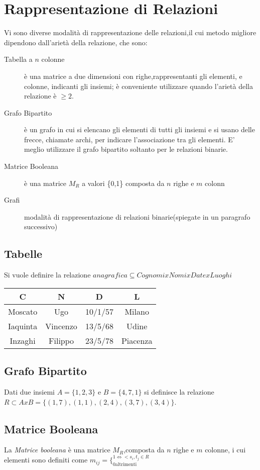 \section{Rappresentazione di Relazioni}
Vi sono diverse modalità di rappresentazione delle relazioni,il cui metodo migliore
dipendono dall'arietà della relazione, che sono:
\begin{description}
    \item[Tabella a $n$ colonne] è una matrice a due dimensioni con righe,rappresentanti
          gli elementi, e colonne, indicanti gli insiemi; è conveniente utilizzare
          quando l'arietà della relazione è $\geq 2$.
    \item[Grafo Bipartito] è un grafo in cui si elencano gli elementi di tutti gli insiemi
         e si usano delle frecce, chiamate archi, per indicare l'associazione tra gli elementi.
         E' meglio utilizzare il grafo bipartito soltanto per le relazioni binarie.
    \item[Matrice Booleana] è una matrice $M_R$ a valori \{0,1\} composta da $n$ righe e $m$ colonn
    \item[Grafi] modalità di rappresentazione di relazioni binarie(spiegate in un paragrafo successivo)
\end{description}

\subsection{Tabelle}
Si vuole definire la relazione $anagrafica \subseteq Cognomi x Nomi x Date x Luoghi$

\begin{tabular}{cccc}
\toprule
C & N & D & L \\
\midrule
Moscato & Ugo & 10/1/57 & Milano \\
Iaquinta & Vincenzo & 13/5/68 & Udine \\
Inzaghi & Filippo & 23/5/78 & Piacenza \\
\bottomrule
\end{tabular}

\subsection{Grafo Bipartito}
Dati due insiemi $A = \{ 1,2,3 \}$ e $B = \{ 4,7,1 \}$ si definisce la relazione
$R \subset A x B = \{ (1,7),(1,1),(2,4),(3,7),(3,4) \}$.


\subsection{Matrice Booleana}
La \emph{Matrice booleana} è una matrice $M_R$,composta da $n$ righe e $m$ colonne,
i cui elementi sono definiti come $m_{ij} = \{ ^{1 \iff <s_i,t_j \in R} _{0 \text{altrimenti}}$


